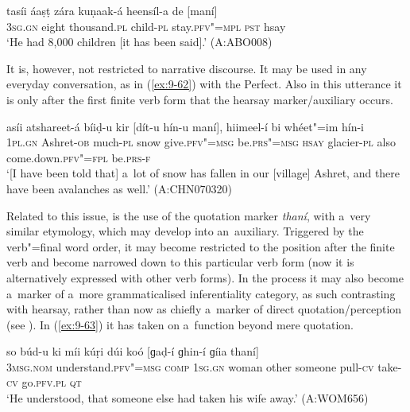 \begin{exe}
\ex
\label{ex:9-61}
\gll tasíi áaṣṭ zára kuṇaak-á heensíl-a de [maní] \\
3\textsc{sg.gn} eight thousand.\textsc{pl} child-\textsc{pl} stay.\textsc{pfv"=mpl} \textsc{pst} hsay \\
\glt `He had 8,000 children [it has been said].' (A:ABO008)
\end{exe}

It is, however, not restricted to narrative discourse. It may be used in any everyday conversation, as in (\ref{ex:9-62}) with the Perfect. Also in this utterance it is only after the first finite verb form that the hearsay marker/auxiliary occurs.

\begin{exe}
\ex
\label{ex:9-62}
\gll asíi atshareet-á bíiḍ-u kir [dít-u hín-u maní], hiimeel-í bi whéet"=im hín-i \\
\textsc{1pl.gn} Ashret-\textsc{ob} much-\textsc{pl} snow give.\textsc{pfv"=msg} be.\textsc{prs"=msg} \textsc{hsay} glacier-\textsc{pl} also come.down.\textsc{pfv"=fpl} be.\textsc{prs-f} \\
\glt `[I have been told that] a~lot of snow has fallen in our [village] Ashret, and there have been avalanches as well.' (A:CHN070320)
\end{exe}

Related to this issue, is the use of the quotation marker \textit{thaní}, with a~very similar etymology, which may develop into an~auxiliary. Triggered by the verb"=final word order, it may become restricted to the position after the finite verb and become narrowed down to this particular verb form (now it is alternatively expressed with other verb forms). In the process it may also become a~marker of a~more grammaticalised inferentiality category, as such contrasting with hearsay, rather than now as chiefly a~marker of direct quotation/perception (see ). In (\ref{ex:9-63}) it has taken on a~function beyond mere quotation.

\begin{exe}
\ex
\label{ex:9-63}
\gll so búd-u ki míi kúṛi dúi koó [ɡaḍ-í ɡhin-í ɡíia thaní]  \\
\textsc{3msg.nom} understand.\textsc{pfv"=msg} \textsc{comp} \textsc{1sg.gn} woman  other someone pull-\textsc{cv} take-\textsc{cv} go.\textsc{pfv.pl} \textsc{qt} \\
\glt `He understood, that someone else had taken his wife away.' (A:WOM656)
\end{exe}


